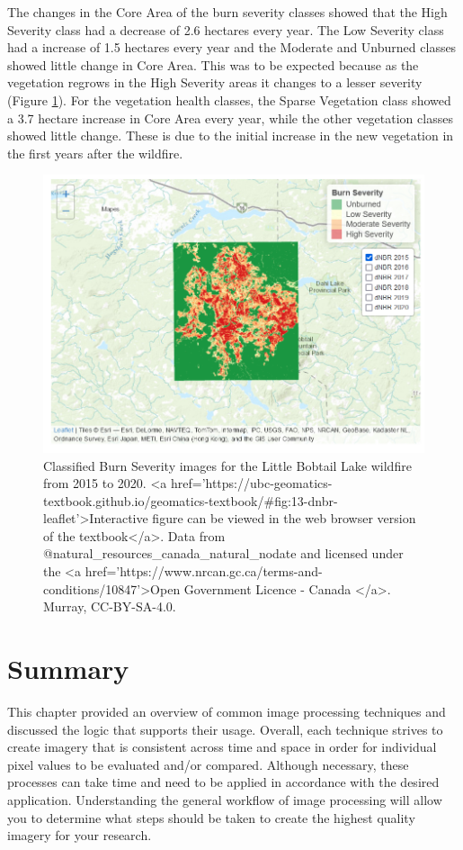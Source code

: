\documentclass[
]{book}
\begin{document}
The changes in the Core Area of the burn severity classes showed that the High Severity class had a decrease of 2.6 hectares every year. The Low Severity class had a increase of 1.5 hectares every year and the Moderate and Unburned classes showed little change in Core Area. This was to be expected because as the vegetation regrows in the High Severity areas it changes to a lesser severity (Figure \ref{fig:13-dnbr-leaflet}). For the vegetation health classes, the Sparse Vegetation class showed a 3.7 hectare increase in Core Area every year, while the other vegetation classes showed little change. These is due to the initial increase in the new vegetation in the first years after the wildfire.

\begin{figure}
\includegraphics[width=0.75\linewidth]{images/13-dnbr-leaflet} \caption{Classified Burn Severity images for the Little Bobtail Lake wildfire from 2015 to 2020. <a
  href='https://ubc-geomatics-textbook.github.io/geomatics-textbook/#fig:13-dnbr-leaflet'>Interactive figure can be viewed in the web browser version of the textbook</a>. Data from @natural_resources_canada_natural_nodate and licensed under the <a href='https://www.nrcan.gc.ca/terms-and-conditions/10847'>Open Government Licence - Canada </a>. Murray, CC-BY-SA-4.0.}\label{fig:13-dnbr-leaflet}
\end{figure}

\hypertarget{summary-6}{%
\section{Summary}\label{summary-6}}

This chapter provided an overview of common image processing techniques and discussed the logic that supports their usage. Overall, each technique strives to create imagery that is consistent across time and space in order for individual pixel values to be evaluated and/or compared. Although necessary, these processes can take time and need to be applied in accordance with the desired application. Understanding the general workflow of image processing will allow you to determine what steps should be taken to create the highest quality imagery for your research.
\end{document}
